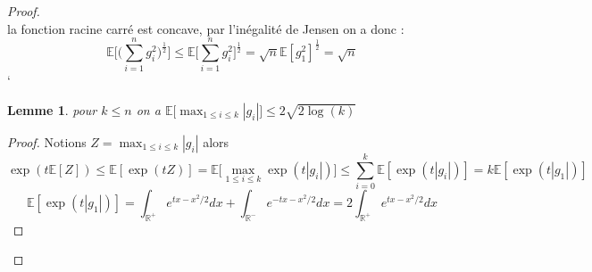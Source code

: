 \documentclass{report}
\newtheorem*{lemme}{Lemme}
\begin{document}
\begin{proof}
\begin{equation*}
	\end{equation*}
	la fonction racine carré est concave, par l'inégalité de Jensen on a donc :
	\begin{equation*}
		\mathbb{E}\big[\big(\sum_{i=1}^{n}g_i^2\big)^{\frac{1}{2}}\big]\leq \mathbb{E}\big[\sum_{i=1}^{n}g_i^2\big]^{\frac{1}{2}}= \sqrt{n} \mathbb{E}[g_1^2]^{\frac{1}{2}}=\sqrt{n} 
	\end{equation*}`
	\begin{lemme}
		pour $k\leq n$ on a $\mathbb{E}\big[\max_{1\leq i \leq k}|g_i|\big]\leq 2\sqrt{2\log(k)}$
	\end{lemme}
	\begin{proof}
		Notions $Z=\max_{1\leq i \leq k}|g_i|$ alors \begin{equation*}
		\exp(t\mathbb{E}[Z])\leq \mathbb{E}[\exp(tZ)]=\mathbb{E}\big[\max_{1\leq i \leq k}\exp(t|g_i|)\big]\leq \sum_{i=0}^{k}\mathbb{E}[\exp(t|g_i|)]=k\mathbb{E}[\exp(t|g_1|)]
		\end{equation*}
		\begin{equation*}
		\mathbb{E}[\exp(t|g_1|)] = \int_{\mathbb{R}^{+}} e^{tx-x^2/2}dx+\int_{\mathbb{R}^{-}} e^{-tx-x^2/2}dx = 2 \int_{\mathbb{R}^{+}} e^{tx-x^2/2}dx 
		\end{equation*}
	\end{proof}
\end{proof}
\end{document}
